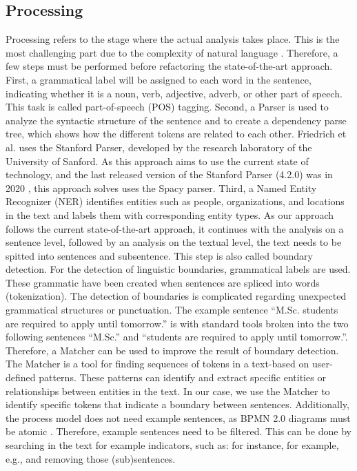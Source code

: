 \subsection{Processing} Processing refers to the stage where the actual analysis takes place. This is the most challenging part due to the complexity of natural language \cite{friedrichProcessModelGeneration2011}. Therefore, a few steps must be performed before refactoring the state-of-the-art approach. 
First, a grammatical label will be assigned to each word in the sentence, indicating whether it is a noun, verb, adjective, adverb, or other part of speech. This task is called part-of-speech (POS) tagging. Second, a Parser is used to analyze the syntactic structure of the sentence and to create a dependency parse tree, which shows how the different tokens are related to each other. Friedrich et al. uses the Stanford Parser, developed by the research laboratory of the University of Sanford. As this approach aims to use the current state of technology, and the last released version of the Stanford Parser (4.2.0) was in 2020 \cite{stanford-nlp}, this approach solves uses the Spacy parser. Third, a Named Entity Recognizer (NER) identifies entities such as people, organizations, and locations in the text and labels them with corresponding entity types.
As our approach follows the current state-of-the-art approach, it continues with the analysis on a sentence level, followed by an analysis on the textual level, the text needs to be spitted into sentences and subsentence. This step is also called boundary detection. For the detection of linguistic boundaries, grammatical labels are used. These grammatic have been created when sentences are spliced into words (tokenization). The detection of boundaries is complicated regarding unexpected grammatical structures or punctuation. 
The example sentence “M.Sc. students are required to apply until tomorrow.” is with standard tools broken into the two following sentences “M.Sc.” and “students are required to apply until tomorrow.”. Therefore, a Matcher can be used to improve the result of boundary detection. The Matcher is a tool for finding sequences of tokens in a text-based on user-defined patterns. These patterns can identify and extract specific entities or relationships between entities in the text. In our case, we use the Matcher to identify specific tokens that indicate a boundary between sentences.
Additionally, the process model does not need example sentences, as BPMN 2.0 diagrams must be atomic \cite{leopoldGeneratingNaturalLanguage2012}. Therefore, example sentences need to be filtered. This can be done by searching in the text for example indicators, such as: for instance, for example, e.g., and removing those (sub)sentences.
